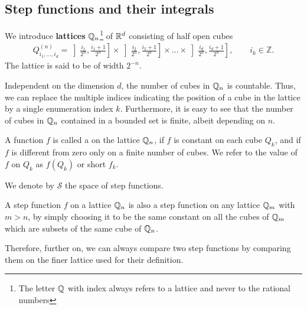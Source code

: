 \subsection{Step functions and their integrals}

\begin{definition}
   We introduce \textbf{lattices}
  $\mathbb Q_n$\footnote{The letter $\mathbb Q$ with index always refers to a
    lattice and never to the rational numbers} of $\mathbb R^d$ consisting of
  half open cubes
  \begin{gather*}
    Q^{(n)}_{i_1,\dots,i_d} =
    \left]\tfrac{i_1}{2^n},\tfrac{i_1+1}{2^n}\right]
    \times
    \left]\tfrac{i_2}{2^n},\tfrac{i_2+1}{2^n}\right]
    \times\dots\times
    \left]\tfrac{i_d}{2^n},\tfrac{i_d+1}{2^n}\right],
    \qquad i_k\in\mathbb Z.
  \end{gather*}
  The lattice is said to be of width $2^{-n}$.
\end{definition}

\begin{note}
  Independent on the dimension $d$, the number of cubes in $\mathbb Q_n$ is
  countable. Thus, we can replace the multiple indices indicating the
  position of a cube in the lattice by a single enumeration index
  $k$. Furthermore, it is easy to see that the number of cubes in
  $\mathbb Q_n$ contained in a bounded set is finite, albeit depending on $n$.
\end{note}

\begin{definition}
  A function $f$ is called a  on the lattice
  $\mathbb Q_n$, if $f$ is constant on each cube $Q_k$, and if $f$ is
  different from zero only on a finite number of cubes.  We refer to
  the value of $f$ on $Q_k$ as $f(Q_k)$ or short $f_k$.
  
  We denote by $\mathcal S$ the space of step functions.
\end{definition}

\begin{note}
  A step function $f$ on a lattice $\mathbb Q_n$ is also a step function on
  any lattice $\mathbb Q_m$ with $m>n$, by simply choosing it to be the same
  constant on all the cubes of $\mathbb Q_m$ which are subsets of the same
  cube of $\mathbb Q_n$.
  
  Therefore, further on, we can always compare two step functions by
  comparing them on the finer lattice used for their definition.
\end{note}


